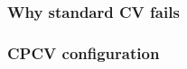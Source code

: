 \documentclass[12pt,a4paper,oneside]{article}
\begin{document}


\subsubsection{Why standard CV fails}\label{subsubsec:cv_fail}



\subsubsection{CPCV configuration}\label{subsubsec:cpcv_config}

%
%
%
\end{document}
